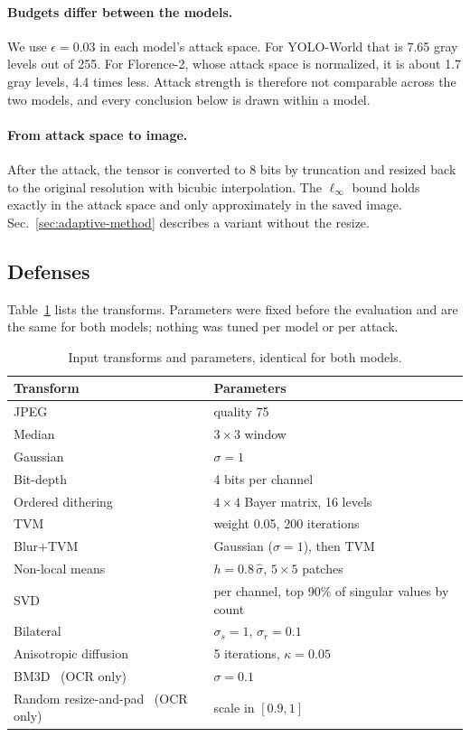 \documentclass[11pt]{article}
\newcommand{\yw}{YOLO-World}
\newcommand{\fl}{Florence-2}
\newcommand{\linf}{\ell_\infty}
\begin{document}
\paragraph{Budgets differ between the models.} We use $\epsilon=0.03$ in
each model's attack space. For \yw{} that is 7.65 gray levels out of 255.
For \fl{}, whose attack space is normalized, it is about 1.7 gray levels,
4.4 times less. Attack strength is therefore not comparable across the two
models, and every conclusion below is drawn within a model.

\paragraph{From attack space to image.} After the attack, the tensor is
converted to 8 bits by truncation and resized back to the original
resolution with bicubic interpolation. The $\linf$ bound holds exactly in
the attack space and only approximately in the saved image.
Sec.~\ref{sec:adaptive-method} describes a variant without the resize.

\subsection{Defenses}

Table~\ref{tab:params} lists the transforms. Parameters were fixed before
the evaluation and are the same for both models; nothing was tuned per model
or per attack.

\begin{table}[t]
\centering\small
\caption{Input transforms and parameters, identical for both models.}
\label{tab:params}
\begin{tabular}{@{}ll@{}}
\toprule
Transform & Parameters \\
\midrule
JPEG~\cite{dziugaite2016study} & quality 75 \\
Median~\cite{xu2018feature} & $3\times3$ window \\
Gaussian & $\sigma=1$ \\
Bit-depth~\cite{xu2018feature} & 4 bits per channel \\
Ordered dithering & $4\times4$ Bayer matrix, 16 levels \\
TVM~\cite{chambolle2004algorithm,guo2018countering} & weight 0.05, 200 iterations \\
Blur+TVM & Gaussian ($\sigma=1$), then TVM \\
Non-local means~\cite{buades2005non} & $h=0.8\,\hat\sigma$, $5\times5$ patches \\
SVD & per channel, top 90\% of singular values by count \\
Bilateral~\cite{tomasi1998bilateral} & $\sigma_s=1$, $\sigma_r=0.1$ \\
Anisotropic diffusion~\cite{perona1990scale} & 5 iterations, $\kappa=0.05$ \\
BM3D~\cite{dabov2007image} (OCR only) & $\sigma=0.1$ \\
Random resize-and-pad~\cite{xie2018mitigating} (OCR only) & scale in $[0.9,1]$ \\
\bottomrule
\end{tabular}
\end{table}
\end{document}
